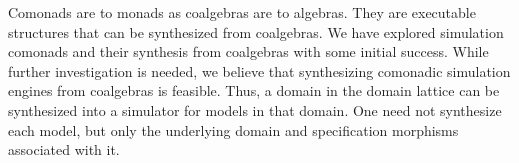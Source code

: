 \documentclass[12pt]{article}
\begin{document}
Comonads are to monads as coalgebras are to algebras.  They are
executable structures that can be synthesized from coalgebras.   We
have explored simulation comonads and their synthesis from coalgebras
with some initial success.  While further investigation is needed, we
believe that synthesizing comonadic simulation engines from coalgebras
is feasible.  Thus, a domain in the domain lattice can be synthesized
into a simulator for models in that domain.  One need not synthesize
each model, but only the underlying domain and specification morphisms
associated with it.


\end{document}
